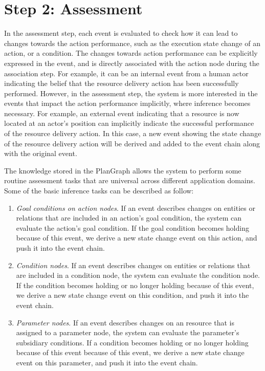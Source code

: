 \section{Step 2: Assessment} %
\label{sec:assessment}
In the assessment step, each event is evaluated to check how it can lead to changes towards the action performance, such as the execution state change of an action, or a condition. The changes towards action performance can be explicitly expressed in the event, and is directly associated with the action node during the association step. For example, it can be an internal event from a human actor indicating the belief that the resource delivery action has been successfully performed. However, in the assessment step, the system is more interested in the events that impact the action performance implicitly, where inference becomes necessary. For example, an external event indicating that a resource is now located at an actor's position can implicitly indicate the successful performance of the resource delivery action. In this case, a new event showing the state change of the resource delivery action will be derived and added to the event chain along with the original event.

The knowledge stored in the PlanGraph allows the system to perform some routine assessment tasks that are universal across different application domains. Some of the basic inference tasks can be described as follow:
\begin{enumerate}
	\item \emph{Goal conditions on action nodes}. If an event describes changes on entities or relations that are included in an action's goal condition, the system can evaluate the action's goal condition. If the goal condition becomes holding because of this event, we derive a new state change event on this action, and push it into the event chain.
	\item \emph{Condition nodes}. If an event describes changes on entities or relations that are included in a condition node, the system can evaluate the condition node. If the condition becomes holding or no longer holding because of this event, we derive a new state change event on this condition, and push it into the event chain. 
	\item \emph{Parameter nodes}. If an event describes changes on an resource that is assigned to a parameter node, the system can evaluate the parameter's subsidiary conditions. If a  condition becomes holding or no longer holding because of this event because of this event, we derive a new state change event on this parameter, and push it into the event chain.
\end{enumerate}

